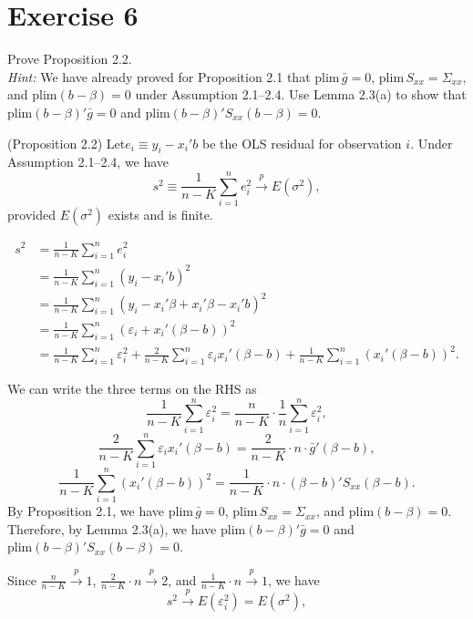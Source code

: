 \documentclass[12pt, letterpaper, onecolumn]{exam}
\begin{document}
\section*{Exercise 6}
Prove Proposition 2.2.\\
\textit{Hint:} We have already proved for Proposition 2.1 that $\mathrm{plim}
    \, \bar g = 0$, $\mathrm{plim}\, S_{xx}= \Sigma_{xx}$, and $\mathrm{plim}(b-\beta
    )=0$ under Assumption 2.1--2.4. Use Lemma 2.3(a) to show that
$\mathrm{plim}(b-\beta)'\bar g = 0$ and
$\mathrm{plim}(b-\beta)'S_{xx}(b -\beta)=0$.

\begin{solution}
    (Proposition 2.2) Let$e_{i}\equiv y_{i}- x_{i}'b$ be the OLS residual
    for observation $i$. Under Assumption 2.1--2.4, we have
    \[
        s^{2}\equiv \frac{1}{n-K}\sum_{i=1}^{n}e_{i}^{2}\xrightarrow{p}E(\sigma
        ^{2}),
    \]
    provided $E(\sigma^{2})$ exists and is finite.

    \begin{align*}
        s^{2} & =\frac{1}{n-K}\sum_{i=1}^{n}e_{i}^{2}                                                                                                                           \\
              & =\frac{1}{n-K}\sum_{i=1}^{n}(y_{i}- x_{i}'b)^{2}                                                                                                                \\
              & =\frac{1}{n-K}\sum_{i=1}^{n}(y_{i}- x_{i}'\beta + x_{i}'\beta - x_{i}'b)^{2}                                                                                    \\
              & =\frac{1}{n-K}\sum_{i=1}^{n}(\varepsilon_{i}+ x_{i}'(\beta - b))^{2}                                                                                            \\
              & =\frac{1}{n-K}\sum_{i=1}^{n}\varepsilon_{i}^{2}+\frac{2}{n-K}\sum_{i=1}^{n}\varepsilon_{i}x_{i}'(\beta - b)+\frac{1}{n-K}\sum_{i=1}^{n}(x_{i}'(\beta - b))^{2}.
    \end{align*}

    We can write the three terms on the RHS as
    \[
        \frac{1}{n-K}\sum_{i=1}^{n}\varepsilon_{i}^{2}=\frac{n}{n-K}\cdot \frac{1}{n}
        \sum_{i=1}^{n}\varepsilon_{i}^{2},
    \]
    \[
        \frac{2}{n-K}\sum_{i=1}^{n}\varepsilon_{i}x_{i}'(\beta - b)=\frac{2}{n-K}
        \cdot n\cdot \bar g'(\beta - b),
    \]
    \[
        \frac{1}{n-K}\sum_{i=1}^{n}(x_{i}'(\beta - b))^{2}=\frac{1}{n-K}\cdot
        n\cdot (\beta - b)'S_{xx}(\beta - b).
    \]
    By Proposition 2.1, we have $\mathrm{plim}\, \bar g = 0$,
    $\mathrm{plim}\, S_{xx}= \Sigma_{xx}$, and $\mathrm{plim}(b-\beta)=0$.
    Therefore, by Lemma 2.3(a), we have $\mathrm{plim}(b-\beta)'\bar g = 0$ and
    $\mathrm{plim}(b-\beta)'S_{xx}(b -\beta)=0$.

    Since $\frac{n}{n-K}\xrightarrow{p}1$,
    $\frac{2}{n-K}\cdot n\xrightarrow{p}2$, and $\frac{1}{n-K}\cdot n\xrightarrow
        {p}1$, we have
    \[
        s^{2}\xrightarrow{p}E(\varepsilon_{i}^{2})=E(\sigma^{2}),
    \]
\end{solution}
\end{document}
